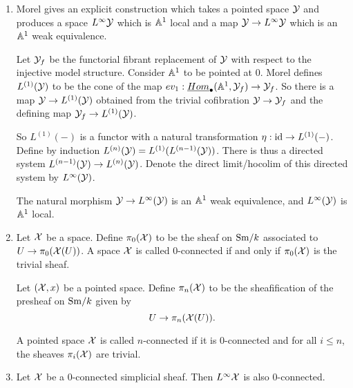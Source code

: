 \documentclass{amsart}%
\begin{document}
\begin{enumerate}
  \item Morel gives an explicit construction which takes a pointed
space $\mathcal{Y}$ and produces a space $L^{\infty}\mathcal{Y}$ which is $\mathbb{A}^1$
local and a map $\mathcal{Y} \to L^{\infty}\mathcal{Y}$ which is an $\mathbb{A}^1$ weak
equivalence.

Let $\mathcal{Y}_f$ be the functorial fibrant replacement of $\mathcal{Y}$ with
respect to the injective model structure. Consider $\mathbb{A}^1$ to be
pointed at $0$. Morel defines $L^{(1)}(\mathcal{Y})$ to be the cone of the
map $ev_1 : \underline{Hom}_{\bullet}(\mathbb{A}^1, \mathcal{Y}_f) \to \mathcal{Y}_f$.
So there is a map $\mathcal{Y} \to L^{(1)}(\mathcal{Y})$ obtained from the
trivial cofibration $\mathcal{Y} \to \mathcal{Y}_f$ and the defining map
$\mathcal{Y}_f \to L^{(1)}(\mathcal{Y})$. 

So $L^{(1)}(-)$ is a functor with a natural transformation
$\eta : \operatorname{id} \to L^{(1)}(-)$. Define by induction
$L^{(n)}(\mathcal{Y}) = L^{(1)}(L^{(n-1)}(\mathcal{Y}))$. There is thus a directed
system $L^{(n-1)}(\mathcal{Y}) \to L^{(n)}(\mathcal{Y})$. Denote the direct
limit/hocolim of this directed system by $L^{\infty}(\mathcal{Y})$.

\begin{proposition}
  The natural morphism $\mathcal{Y} \to L^{\infty}(\mathcal{Y})$ is an $\mathbb{A}^1$
  weak equivalence, and $L^{\infty}(\mathcal{Y})$ is $\mathbb{A}^1$ local.
\end{proposition}


  \item 

\begin{definition}
  Let $\mathcal{X}$ be a space. Define $\pi_0(\mathcal{X})$ to be the
  sheaf on $\mathrm{Sm}/k$ associated to $U \to \pi_0(\mathcal{X}(U))$. A space
  $\mathcal{X}$ is called $0$-connected if and only if
  $\pi_0(\mathcal{X})$ is the trivial sheaf. 

  Let $(\mathcal{X},x)$ be a pointed space. Define
  $\pi_n(\mathcal{X})$ to be the sheafification of the presheaf
  on $\mathrm{Sm}/k$ given by
  \begin{equation*}
    U \to \pi_n(\mathcal{X}(U)).
  \end{equation*}

  A pointed space $\mathcal{X}$ is called $n$-connected if it is
  $0$-connected and for all $i\leq n$, the sheaves
  $\pi_i(\mathcal{X})$ are trivial.
\end{definition}

  \item 

\begin{proposition}
  Let $\mathcal{X}$ be a $0$-connected simplicial sheaf. Then
  $L^{\infty}\mathcal{X}$ is also $0$-connected.
\end{proposition}


\end{enumerate}
\end{document}
